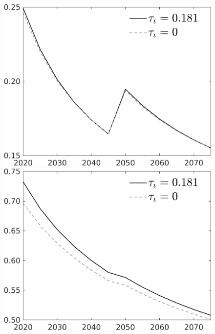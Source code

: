\begin{figure}[h!!]
\begin{minipage}[]{0.32\textwidth}
\end{minipage}	
\begin{minipage}[]{0.32\textwidth}
\includegraphics[width=1\textwidth]{../../codding_model/own_basedOnFried/optimalPol_010922_revision/figures/all_13Sept22/CompTaul_Reg0_sg_spillover0_nsk0_xgr0_sep1_LFlimit1_emsbase0_countec0_GovRev1_etaa0.79_lgd1.png}
\end{minipage}
\begin{minipage}[]{0.32\textwidth}
\includegraphics[width=1\textwidth]{../../codding_model/own_basedOnFried/optimalPol_010922_revision/figures/all_13Sept22/CompTaul_Reg0_sn_spillover0_nsk0_xgr0_sep1_LFlimit1_emsbase0_countec0_GovRev1_etaa0.79_lgd1.png}

\end{minipage}
\end{figure}
